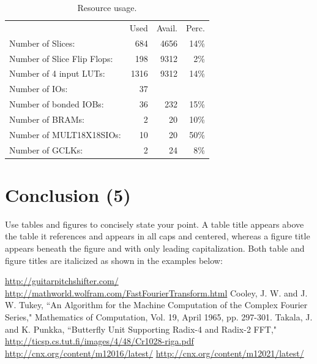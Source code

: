 \documentclass[12pt, letterpaper]{article}
\begin{document}
\begin{table}[h]
\centering
\begin{tabular}{l  r  r  r}
                                       & Used  & Avail. & Perc. \\
  Number of Slices:                    &  684  & 4656  &  14\%  \\
  Number of Slice Flip Flops:          &  198  & 9312  &   2\%  \\
  Number of 4 input LUTs:              & 1316  & 9312  &  14\%  \\
  Number of IOs:                       &   37  &       &      \\
  Number of bonded IOBs:               &   36  &  232  &  15\%  \\
  Number of BRAMs:                     &    2  &   20  &  10\%  \\
  Number of MULT18X18SIOs:             &   10  &   20  &  50\%  \\
  Number of GCLKs:                     &    2  &   24  &   8\%  \\
\end{tabular}
\caption{Resource usage.}
\label{tab:usage}
\end{table}


\section{Conclusion (5)}
Use tables and figures to concisely state your point. A table title appears above the table it references and appears in all caps and centered, whereas a figure title appears beneath the figure and with only leading capitalization. Both table and figure titles are italicized as shown in the examples below:



\begin{thebibliography}{10}
 \url{http://guitarpitchshifter.com/}
 \url{http://mathworld.wolfram.com/FastFourierTransform.html}
 	Cooley, J. W. and J. W. Tukey, ``An Algorithm for the Machine Computation of the Complex Fourier Series," Mathematics of Computation, Vol. 19, April 1965, pp. 297-301.
 Takala, J. and K. Punkka, ``Butterfly Unit Supporting Radix-4 and Radix-2 FFT," \url{http://ticsp.cs.tut.fi/images/4/48/Cr1028-riga.pdf}
 \url{http://cnx.org/content/m12016/latest/}
 \url{http://cnx.org/content/m12021/latest/}
\end{thebibliography}
\end{document}
